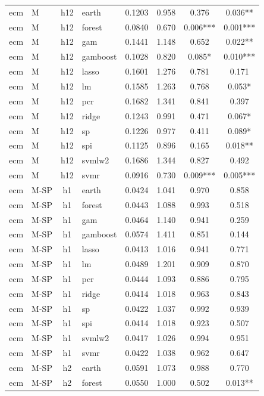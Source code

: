 \begin{ThreePartTable}
\begin{longtable}[t]{llclcccc}
\addlinespace
ecm & M & h12 & earth & 0.1203 & 0.958 & 0.376 & 0.036**\\
ecm & M & h12 & forest & 0.0840 & 0.670 & 0.006*** & 0.001***\\
ecm & M & h12 & gam & 0.1441 & 1.148 & 0.652 & 0.022**\\
ecm & M & h12 & gamboost & 0.1028 & 0.820 & 0.085* & 0.010***\\
ecm & M & h12 & lasso & 0.1601 & 1.276 & 0.781 & 0.171\\
ecm & M & h12 & lm & 0.1585 & 1.263 & 0.768 & 0.053*\\
ecm & M & h12 & pcr & 0.1682 & 1.341 & 0.841 & 0.397\\
ecm & M & h12 & ridge & 0.1243 & 0.991 & 0.471 & 0.067*\\
ecm & M & h12 & sp & 0.1226 & 0.977 & 0.411 & 0.089*\\
ecm & M & h12 & spi & 0.1125 & 0.896 & 0.165 & 0.018**\\
ecm & M & h12 & svmlw2 & 0.1686 & 1.344 & 0.827 & 0.492\\
ecm & M & h12 & svmr & 0.0916 & 0.730 & 0.009*** & 0.005***\\
\addlinespace
ecm & M-SP & h1 & earth & 0.0424 & 1.041 & 0.970 & 0.858\\
ecm & M-SP & h1 & forest & 0.0443 & 1.088 & 0.993 & 0.518\\
ecm & M-SP & h1 & gam & 0.0464 & 1.140 & 0.941 & 0.259\\
ecm & M-SP & h1 & gamboost & 0.0574 & 1.411 & 0.851 & 0.144\\
ecm & M-SP & h1 & lasso & 0.0413 & 1.016 & 0.941 & 0.771\\
ecm & M-SP & h1 & lm & 0.0489 & 1.201 & 0.909 & 0.870\\
ecm & M-SP & h1 & pcr & 0.0444 & 1.093 & 0.886 & 0.795\\
ecm & M-SP & h1 & ridge & 0.0414 & 1.018 & 0.963 & 0.843\\
ecm & M-SP & h1 & sp & 0.0422 & 1.037 & 0.992 & 0.939\\
ecm & M-SP & h1 & spi & 0.0414 & 1.018 & 0.923 & 0.507\\
ecm & M-SP & h1 & svmlw2 & 0.0417 & 1.026 & 0.994 & 0.951\\
ecm & M-SP & h1 & svmr & 0.0422 & 1.038 & 0.962 & 0.647\\
\addlinespace
ecm & M-SP & h2 & earth & 0.0591 & 1.073 & 0.988 & 0.770\\
ecm & M-SP & h2 & forest & 0.0550 & 1.000 & 0.502 & 0.013**\\

\end{longtable}
\end{ThreePartTable}
